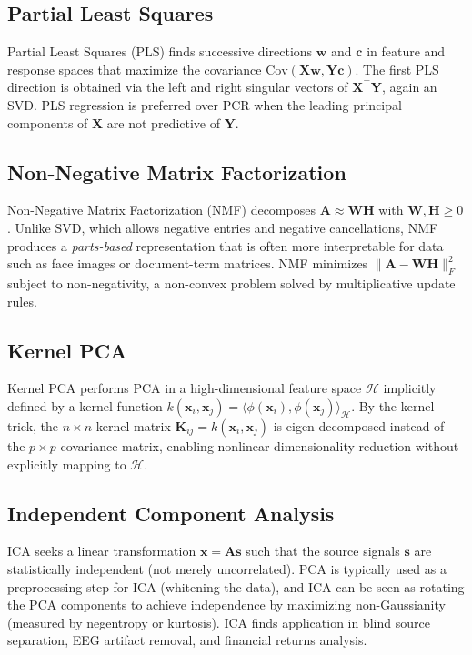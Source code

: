 \documentclass[conference]{IEEEtran}
\begin{document}
\subsection{Partial Least Squares}

Partial Least Squares (PLS) \cite{wold1975} finds successive directions $\mathbf{w}$ and $\mathbf{c}$ in feature and response spaces that maximize the covariance $\text{Cov}(\mathbf{X}\mathbf{w}, \mathbf{Y}\mathbf{c})$. The first PLS direction is obtained via the left and right singular vectors of $\mathbf{X}^\top\mathbf{Y}$, again an SVD. PLS regression is preferred over PCR when the leading principal components of $\mathbf{X}$ are not predictive of $\mathbf{Y}$.

\subsection{Non-Negative Matrix Factorization}

Non-Negative Matrix Factorization (NMF) \cite{lee1999} decomposes $\mathbf{A} \approx \mathbf{W}\mathbf{H}$ with $\mathbf{W}, \mathbf{H} \geq 0$. Unlike SVD, which allows negative entries and negative cancellations, NMF produces a \emph{parts-based} representation that is often more interpretable for data such as face images or document-term matrices. NMF minimizes $\|\mathbf{A} - \mathbf{W}\mathbf{H}\|_F^2$ subject to non-negativity, a non-convex problem solved by multiplicative update rules.

\subsection{Kernel PCA}

Kernel PCA \cite{scholkopf1998} performs PCA in a high-dimensional feature space $\mathcal{H}$ implicitly defined by a kernel function $k(\mathbf{x}_i, \mathbf{x}_j) = \langle \phi(\mathbf{x}_i), \phi(\mathbf{x}_j)\rangle_{\mathcal{H}}$. By the kernel trick, the $n \times n$ kernel matrix $\mathbf{K}_{ij} = k(\mathbf{x}_i,\mathbf{x}_j)$ is eigen-decomposed instead of the $p \times p$ covariance matrix, enabling nonlinear dimensionality reduction without explicitly mapping to $\mathcal{H}$.

\subsection{Independent Component Analysis}

ICA \cite{comon1994} seeks a linear transformation $\mathbf{x} = \mathbf{A}\mathbf{s}$ such that the source signals $\mathbf{s}$ are statistically independent (not merely uncorrelated). PCA is typically used as a preprocessing step for ICA (whitening the data), and ICA can be seen as rotating the PCA components to achieve independence by maximizing non-Gaussianity (measured by negentropy or kurtosis). ICA finds application in blind source separation, EEG artifact removal, and financial returns analysis.
\end{document}
